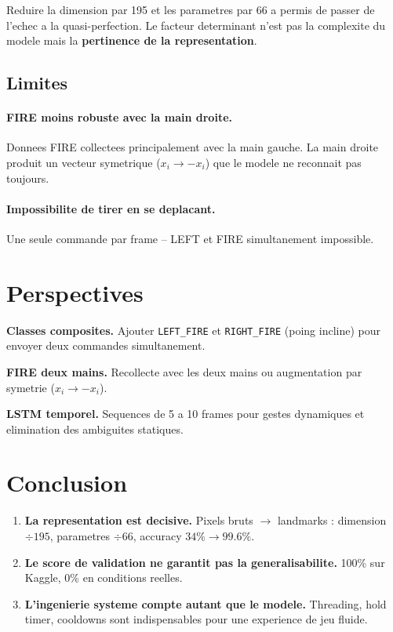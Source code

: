 \documentclass[12pt,a4paper]{article}
\begin{document}
Reduire la dimension par 195 et les parametres par 66 a permis de passer
de l'echec a la quasi-perfection. Le facteur determinant n'est pas la
complexite du modele mais la \textbf{pertinence de la representation}.

\subsection{Limites}

\paragraph{FIRE moins robuste avec la main droite.}
Donnees FIRE collectees principalement avec la main gauche.
La main droite produit un vecteur symetrique ($x_i \to -x_i$)
que le modele ne reconnait pas toujours.

\paragraph{Impossibilite de tirer en se deplacant.}
Une seule commande par frame -- LEFT et FIRE simultanement impossible.

\section{Perspectives}

\textbf{Classes composites.}
Ajouter \texttt{LEFT\_FIRE} et \texttt{RIGHT\_FIRE} (poing incline)
pour envoyer deux commandes simultanement.

\textbf{FIRE deux mains.}
Recollecte avec les deux mains ou augmentation par symetrie ($x_i \to -x_i$).

\textbf{LSTM temporel.}
Sequences de 5 a 10 frames pour gestes dynamiques
et elimination des ambiguites statiques.

\section{Conclusion}

\begin{enumerate}
\item \textbf{La representation est decisive.}
      Pixels bruts $\to$ landmarks : dimension $\div 195$,
      parametres $\div 66$, accuracy $34\% \to 99.6\%$.

\item \textbf{Le score de validation ne garantit pas la generalisabilite.}
      100\% sur Kaggle, 0\% en conditions reelles.

\item \textbf{L'ingenierie systeme compte autant que le modele.}
      Threading, hold timer, cooldowns sont indispensables
      pour une experience de jeu fluide.
\end{enumerate}
\end{document}
